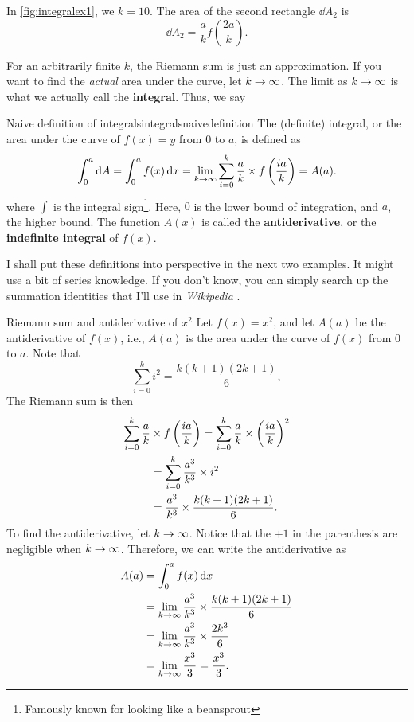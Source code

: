 In \cref{fig:integralex1}, we  $k = 10$. The area of the second rectangle $\dd{A_2}$ is
\begin{equation*}
    \dd{A_2} = \frac{a}{k}f\left(\frac{2a}{k}\right).    
\end{equation*}

For an arbitrarily finite $k$, the Riemann sum is just an approximation. If you want to find the \textit{actual} area under the curve, let $k \rightarrow \infty$. The limit as $k \rightarrow \infty$ is what we actually call the \textbf{integral}. Thus, we say
\begin{df}{Naive definition of integrals}{integralsnaivedefinition}
    The (definite) integral, or the area under the curve of $f(x) = y$ from $0$ to $a$, is defined as
    \begin{equation}
        \int_{0}^{a}\dd{A} = \int_{0}^{a}f(x)\dd{x} = \lim_{k \rightarrow \infty}\sum_{i = 0}^{k}\frac{a}{k} \times f\left(\frac{ia}{k}\right) = A(a).
    \end{equation}
    where $\int$ is the integral sign\footnote{Famously known for looking like a beansprout}. Here, $0$ is the lower bound of integration, and $a$, the higher bound. The function $A(x)$ is called the \textbf{antiderivative}, or the \textbf{indefinite integral} of $f(x)$.
\end{df}

I shall put these definitions into perspective in the next two examples. It might use a bit of series knowledge. If you don't know, you can simply search up the summation identities that I'll use in \emph{Wikipedia} \cite{wikipedia-summation}.

\begin{exmp}{Riemann sum and antiderivative of $x^2$}{}
    Let $f(x) = x^2$, and let $A(a)$ be the antiderivative of $f(x)$, i.e., $A(a)$ is the area under the curve of $f(x)$ from $0$ to $a$. Note that
    \begin{equation}
        \sum_{i = 0}^{k}i^2 = \frac{k(k + 1)(2k + 1)}{6},
    \end{equation}
    The Riemann sum is then
    \begin{align}
        \sum_{i = 0}^{k}\frac{a}{k}&\times f\left( i a \over k \right) = \sum_{i = 0}^k\frac{a}{k}\times \left(ia\over k\right)^2 \\
        &= \sum_{i = 0}^k\frac{a^3}{k^3}\times i^2 \\
        &= \frac{a^3}{k^3}\times \frac{k(k + 1)(2k + 1)}{6}.
    \end{align}
    To find the antiderivative, let $k \rightarrow \infty$. Notice that the $+1$ in the parenthesis are negligible when $k \rightarrow \infty$. Therefore, we can write the antiderivative as
    \begin{align}
        A(a) &= \int_0^a f(x)\dd{x} \\
        &= \lim_{k \rightarrow \infty}\frac{a^3}{k^3}\times \frac{k(k + 1)(2k + 1)}{6} \\
        &= \lim_{k \rightarrow \infty}\frac{a^3}{k^3}\times \frac{2k^3}{6} \\
        &= \lim_{k \rightarrow \infty}\frac{x^3}{3} = \frac{x^3}{3}.
    \end{align}
\end{exmp}

